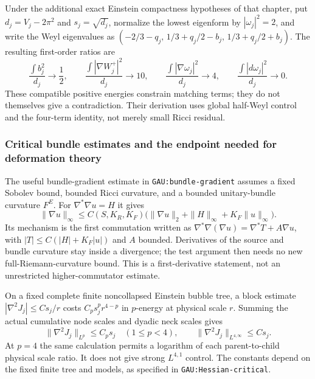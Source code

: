 \documentclass[a4paper,11pt]{article}
\numberwithin{equation}{section}
\theoremstyle{definition}
\begin{document}
Under the additional exact Einstein compactness hypotheses of that chapter, put $d_j=V_j-2\pi^2$ and $s_j=\sqrt{d_j}$, normalize the lowest eigenform by $|\omega_j|^2=2$, and write the Weyl eigenvalues as
$(-2/3-q_j,\,1/3+q_j/2-b_j,\,1/3+q_j/2+b_j)$.
The resulting first-order ratios are
\begin{equation}\label{eq:fixed-KE-ratios}
\frac{\int b_j^2}{d_j}\to\frac12,\qquad
\frac{\int|\nabla W_j^+|^2}{d_j}\to10,\qquad
\frac{\int|\nabla\omega_j|^2}{d_j}\to4,\qquad
\frac{\int|d\omega_j|^2}{d_j}\to0.
\end{equation}
These compatible positive energies constrain matching terms; they do not themselves give a contradiction. Their derivation uses global half-Weyl control and the four-term identity, not merely small Ricci residual.

\subsubsection{Critical bundle estimates and the endpoint needed for deformation theory}\label{sec:critical-bundle-tools}
The useful bundle-gradient estimate in \texttt{GAU:bundle-gradient} assumes a fixed Sobolev bound, bounded Ricci curvature, and a bounded unitary-bundle curvature $F^E$. For $\nabla^*\nabla u=H$ it gives
\[
\|\nabla u\|_\infty\le C(S,K_R,K_F)
\bigl(\|\nabla u\|_2+\|H\|_\infty+K_F\|u\|_\infty\bigr).
\]
Its mechanism is the first commutation written as
$\nabla^*\nabla(\nabla u)=\nabla^*T+A\nabla u$, with
$|T|\le C(|H|+K_F|u|)$ and $A$ bounded. Derivatives of the source and bundle curvature stay inside a divergence; the test argument then needs no new full-Riemann-curvature bound. This is a first-derivative statement, not an unrestricted higher-commutator estimate.

On a fixed complete finite noncollapsed Einstein bubble tree, a block estimate $|\nabla^2J_j|\le Cs_j/r$ costs $C_ps_j^pr^{4-p}$ in $p$-energy at physical scale $r$. Summing the actual cumulative node scales and dyadic neck scales gives
\begin{equation}\label{eq:bubble-critical-interface}
\|\nabla^2J_j\|_{L^p}\le C_ps_j\quad(1\le p<4),\qquad
\|\nabla^2J_j\|_{L^{4,\infty}}\le Cs_j.
\end{equation}
At $p=4$ the same calculation permits a logarithm of each parent-to-child physical scale ratio. It does not give strong $L^{4,1}$ control. The constants depend on the fixed finite tree and models, as specified in \texttt{GAU:Hessian-critical}.
\end{document}
